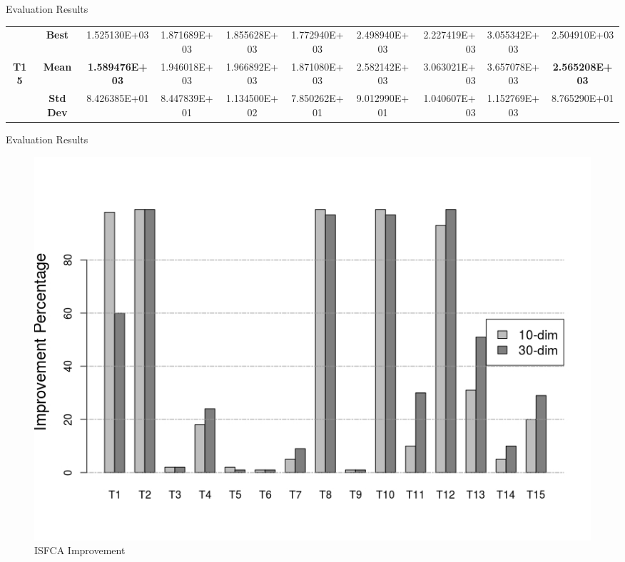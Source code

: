 \documentclass[table]{beamer}
\begin{document}
\begin{frame}{Evaluation Results}
\begin{table}[htbp]
{\begin{tabular}{|c|c|c|c|c|c|c|r|c|c|}
				\multicolumn{ 1}{|c|}{} & \textbf{Best} & 1.525130E+03 & 1.871689E+03 & 1.855628E+03 & 1.772940E+03 & 2.498940E+03 & 2.227419E+03 & 3.055342E+03 & 2.504910E+03 \\ \cline{ 2- 10}
				\multicolumn{ 1}{|c|}{\textbf{T15}} & \textbf{Mean} & \textbf{1.589476E+03} & 1.946018E+03 & 1.966892E+03 & 1.871080E+03 & 2.582142E+03 & 3.063021E+03 & 3.657078E+03 & \textbf{2.565208E+03} \\ \cline{ 2- 10}
				\multicolumn{ 1}{|c|}{} & \textbf{Std Dev} & 8.426385E+01 & 8.447839E+01 & 1.134500E+02 & 7.850262E+01 & 9.012990E+01 & 1.040607E+03 & 1.152769E+03 & 8.765290E+01 \\ \hline
			\end{tabular}}
			\label{}
		\end{table}
	\end{frame}
	
	\begin{frame}{Evaluation Results}
		\begin{figure}[v]
			\includegraphics[scale=0.43]{percent_I}
			\centering
			\caption{ISFCA Improvement}
			\label{ref:percent_i}
		\end{figure}
	\end{frame}
\end{document}
